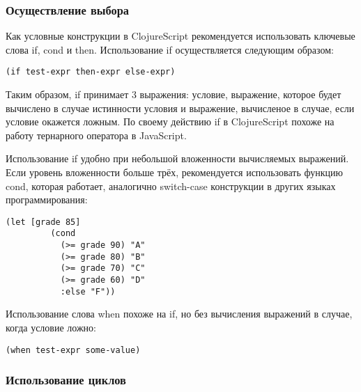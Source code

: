 \subsubsection*{Осуществление выбора}

Как условные конструкции в ClojureScript  рекомендуется использовать ключевые слова if, cond и then. Использование if осуществляется следующим образом: 

\begin{center}
	\captionsetup{justification=raggedright,singlelinecheck=off}
	\begin{lstlisting}[label=lst:if-usage,caption=Синтаксис использования if]
(if test-expr then-expr else-expr)
	\end{lstlisting}
\end{center}

Таким образом, if принимает 3 выражения: условие, выражение, которое будет вычислено в случае истинности условия и выражение, вычисленое в случае, если условие окажется ложным. По своему действию if в ClojureScript похоже на работу тернарного оператора в JavaScript.

Использование if удобно при небольшой вложенности вычисляемых выражений. Если уровень вложенности больше трёх, рекомендуется использовать функцию cond, которая работает, аналогично switch-case конструкции в других языках программирования:

\begin{center}
	\captionsetup{justification=raggedright,singlelinecheck=off}
	\begin{lstlisting}[label=lst:cond-usage,caption=Пример использования cond]
(let [grade 85]
         (cond
           (>= grade 90) "A"
           (>= grade 80) "B"
           (>= grade 70) "C"
           (>= grade 60) "D"
           :else "F"))
	\end{lstlisting}
\end{center}

Использование слова  when похоже на if, но без вычисления выражений в случае, когда условие ложно:
\begin{center}
	\captionsetup{justification=raggedright,singlelinecheck=off}
	\begin{lstlisting}[label=lst:when,caption=Синтаксис использования when]
(when test-expr some-value)
	\end{lstlisting}
\end{center}

\subsubsection*{Использование циклов}

